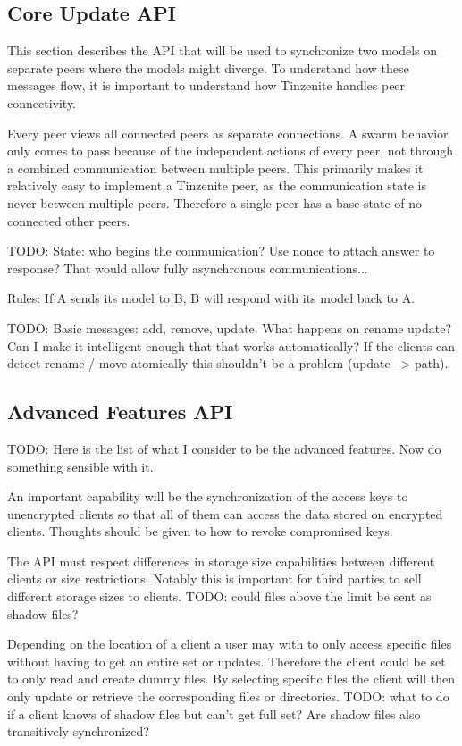 \subsection{Core Update API}

This section describes the API that will be used to synchronize two models on separate peers where the models might diverge.
To understand how these messages flow, it is important to understand how Tinzenite handles peer connectivity.

Every peer views all connected peers as separate connections.
A swarm behavior only comes to pass because of the independent actions of every peer, not through a combined communication between multiple peers.
This primarily makes it relatively easy to implement a Tinzenite peer, as the communication state is never between multiple peers.
Therefore a single peer has a base state of no connected other peers.

TODO: State: who begins the communication?
Use nonce to attach answer to response?
That would allow fully asynchronous communications...

Rules: If A sends its model to B, B will respond with its model back to A.

TODO: Basic messages: add, remove, update.
What happens on rename update?
Can I make it intelligent enough that that works automatically?
If the clients can detect rename / move atomically this shouldn't be a problem (update --> path).

\subsection{Advanced Features API}

TODO: Here is the list of what I consider to be the advanced features.
Now do something sensible with it.

\begin{description}[leftmargin=2em,style=nextline,noitemsep,nolistsep]
\item[Encryption Key Management]
    An important capability will be the synchronization of the access keys to unencrypted clients so that all of them can access the data stored on encrypted clients.
    Thoughts should be given to how to revoke compromised keys.
\item[Space Management]
    The API must respect differences in storage size capabilities between different clients or size restrictions.
    Notably this is important for third parties to sell different storage sizes to clients.
    TODO: could files above the limit be sent as shadow files?
\item[Shadow Files]
    Depending on the location of a client a user may with to only access specific files without having to get an entire set or updates.
    Therefore the client could be set to only read and create dummy files.
    By selecting specific files the client will then only update or retrieve the corresponding files or directories.
    TODO: what to do if a client knows of shadow files but can't get full set?
    Are shadow files also transitively synchronized?
\end{description}

